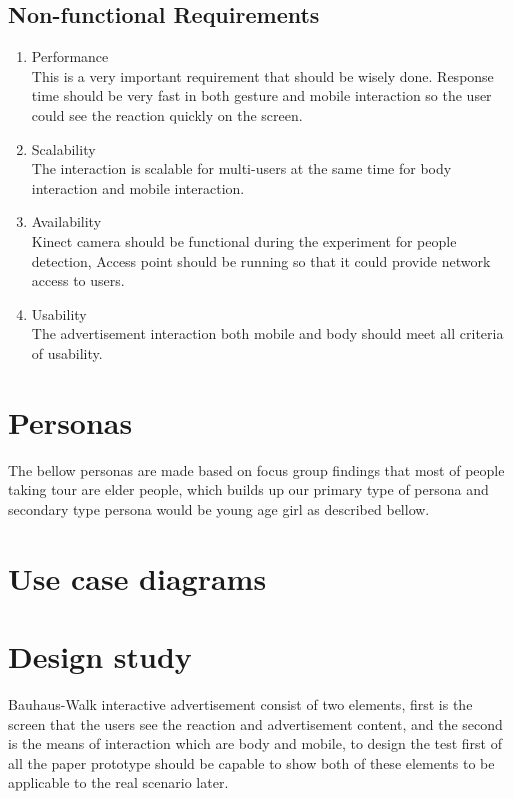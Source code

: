 \subsection{Non-functional Requirements}

\begin{enumerate}
\item	Performance \\
This is a very important requirement that should be wisely done. Response time should be very fast in both gesture and mobile interaction so the user could see the reaction quickly on the screen. 

\item	Scalability \\
The interaction is scalable for multi-users at the same time for body interaction and mobile interaction.

\item	Availability \\
Kinect camera should be functional during the experiment for people detection, Access point should be running so that it could provide network access to users.

\item	Usability \\
The advertisement interaction both mobile and body should meet all criteria of usability.
\end{enumerate}

\section{Personas}
The bellow personas are made based on focus group findings that most of people taking tour are elder people, which builds up our primary type of persona and secondary type persona would be young age girl as described bellow.




\section{Use case diagrams}





\section{Design study}
Bauhaus-Walk interactive advertisement consist of two elements, first is the screen that the users see the reaction and advertisement content, and the second is the means of interaction which are body and mobile, to design the test first of all the paper prototype should be capable to show both of these elements to be applicable to the real scenario later.  

